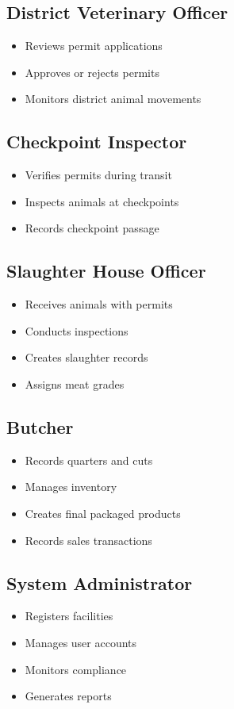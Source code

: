 \documentclass[11pt,a4paper]{article}
\begin{document}
\subsection{District Veterinary Officer}
\begin{itemize}[leftmargin=*]
    \item Reviews permit applications
    \item Approves or rejects permits
    \item Monitors district animal movements
\end{itemize}

\subsection{Checkpoint Inspector}
\begin{itemize}[leftmargin=*]
    \item Verifies permits during transit
    \item Inspects animals at checkpoints
    \item Records checkpoint passage
\end{itemize}

\subsection{Slaughter House Officer}
\begin{itemize}[leftmargin=*]
    \item Receives animals with permits
    \item Conducts inspections
    \item Creates slaughter records
    \item Assigns meat grades
\end{itemize}

\subsection{Butcher}
\begin{itemize}[leftmargin=*]
    \item Records quarters and cuts
    \item Manages inventory
    \item Creates final packaged products
    \item Records sales transactions
\end{itemize}

\subsection{System Administrator}
\begin{itemize}[leftmargin=*]
    \item Registers facilities
    \item Manages user accounts
    \item Monitors compliance
    \item Generates reports
\end{itemize}
\end{document}
